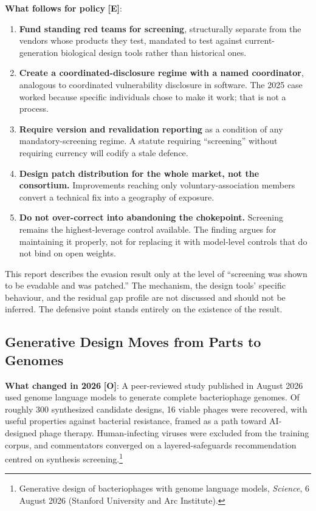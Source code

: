 \documentclass[11pt,letterpaper]{article}
\begin{document}
\textbf{What follows for policy} \textbf{[E]}:
\begin{enumerate}
  \item \textbf{Fund standing red teams for screening}, structurally separate from the vendors whose products they test, mandated to test against current-generation biological design tools rather than historical ones.
  \item \textbf{Create a coordinated-disclosure regime with a named coordinator}, analogous to coordinated vulnerability disclosure in software. The 2025 case worked because specific individuals chose to make it work; that is not a process.
  \item \textbf{Require version and revalidation reporting} as a condition of any mandatory-screening regime. A statute requiring ``screening'' without requiring currency will codify a stale defence.
  \item \textbf{Design patch distribution for the whole market, not the consortium.} Improvements reaching only voluntary-association members convert a technical fix into a geography of exposure.
  \item \textbf{Do not over-correct into abandoning the chokepoint.} Screening remains the highest-leverage control available. The finding argues for maintaining it properly, not for replacing it with model-level controls that do not bind on open weights.
\end{enumerate}

\begin{notebox}
This report describes the evasion result only at the level of ``screening was shown to be evadable and was patched.'' The mechanism, the design tools' specific behaviour, and the residual gap profile are not discussed and should not be inferred. The defensive point stands entirely on the existence of the result.
\end{notebox}

\subsection{Generative Design Moves from Parts to Genomes}

\textbf{What changed in 2026} \textbf{[O]}: A peer-reviewed study published in August 2026 used genome language models to generate complete bacteriophage genomes. Of roughly 300 synthesized candidate designs, 16 viable phages were recovered, with useful properties against bacterial resistance, framed as a path toward AI-designed phage therapy. Human-infecting viruses were excluded from the training corpus, and commentators converged on a layered-safeguards recommendation centred on synthesis screening.\footnote{Generative design of bacteriophages with genome language models, \textit{Science}, 6 August 2026 (Stanford University and Arc Institute).}
\end{document}
